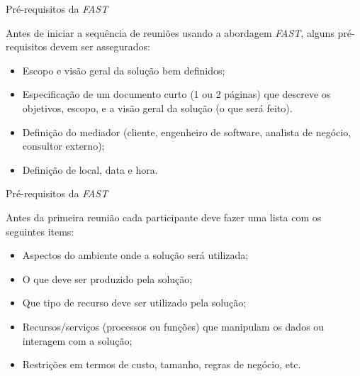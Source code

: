 \documentclass[xcolor=x11names,compress]{beamer}
\begin{document}
\begin{frame}{Pré-requisitos da \textit{FAST}}

Antes de iniciar a sequência de reuniões usando a abordagem \textit{FAST}, alguns pré-requisitos devem ser assegurados:

\begin{itemize}

\item Escopo e visão geral da solução bem definidos;

\item Especificação de um documento curto (1 ou 2 páginas) que descreve os objetivos, escopo, e a visão geral da solução (o que será feito).

\item Definição do mediador (cliente, engenheiro de software, analista de negócio, consultor externo);

 \item Definição de local, data e hora. 

\end{itemize}

\end{frame}

\begin{frame}{Pré-requisitos da \textit{FAST}}

Antes da primeira reunião cada participante deve fazer uma lista com os seguintes items:

\begin{itemize}
\itemsep 5mm

\item Aspectos do ambiente onde a solução será utilizada;

\item O que deve ser produzido pela solução;

\item Que tipo de recurso deve ser utilizado pela solução;

\item Recursos/serviços (processos ou funções) que manipulam os dados ou interagem com a solução;

\item Restrições em termos de custo, tamanho, regras de negócio, etc.

\end{itemize}

\end{frame}
\end{document}
